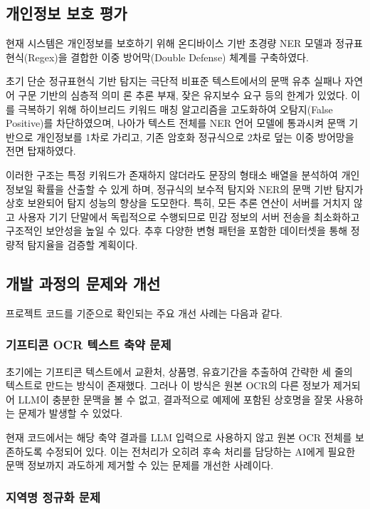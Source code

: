 \documentclass[11pt,a4paper]{article}
\begin{document}
\subsection{개인정보 보호 평가}

현재 시스템은 개인정보를 보호하기 위해 온디바이스 기반 초경량 NER 모델과 정규표현식(Regex)을 결합한 이중 방어막(Double Defense) 체계를 구축하였다.

초기 단순 정규표현식 기반 탐지는 극단적 비표준 텍스트에서의 문맥 유추 실패나 자연어 구문 기반의 심층적 의미 론 추론 부재, 잦은 유지보수 요구 등의 한계가 있었다. 이를 극복하기 위해 하이브리드 키워드 매칭 알고리즘을 고도화하여 오탐지(False Positive)를 차단하였으며, 나아가 텍스트 전체를 NER 언어 모델에 통과시켜 문맥 기반으로 개인정보를 1차로 가리고, 기존 암호화 정규식으로 2차로 덮는 이중 방어망을 전면 탑재하였다.

이러한 구조는 특정 키워드가 존재하지 않더라도 문장의 형태소 배열을 분석하여 개인정보일 확률을 산출할 수 있게 하며, 정규식의 보수적 탐지와 NER의 문맥 기반 탐지가 상호 보완되어 탐지 성능의 향상을 도모한다. 특히, 모든 추론 연산이 서버를 거치지 않고 사용자 기기 단말에서 독립적으로 수행되므로 민감 정보의 서버 전송을 최소화하고 구조적인 보안성을 높일 수 있다. 추후 다양한 변형 패턴을 포함한 데이터셋을 통해 정량적 탐지율을 검증할 계획이다.

\subsection{개발 과정의 문제와 개선}

프로젝트 코드를 기준으로 확인되는 주요 개선 사례는 다음과 같다.

\subsubsection{기프티콘 OCR 텍스트 축약 문제}

초기에는 기프티콘 텍스트에서 교환처, 상품명, 유효기간을 추출하여 간략한 세 줄의 텍스트로 만드는 방식이 존재했다. 그러나 이 방식은 원본 OCR의 다른 정보가 제거되어 LLM이 충분한 문맥을 볼 수 없고, 결과적으로 예제에 포함된 상호명을 잘못 사용하는 문제가 발생할 수 있었다.

현재 코드에서는 해당 축약 결과를 LLM 입력으로 사용하지 않고 원본 OCR 전체를 보존하도록 수정되어 있다. 이는 전처리가 오히려 후속 처리를 담당하는 AI에게 필요한 문맥 정보까지 과도하게 제거할 수 있는 문제를 개선한 사례이다.

\subsubsection{지역명 정규화 문제}
\end{document}
